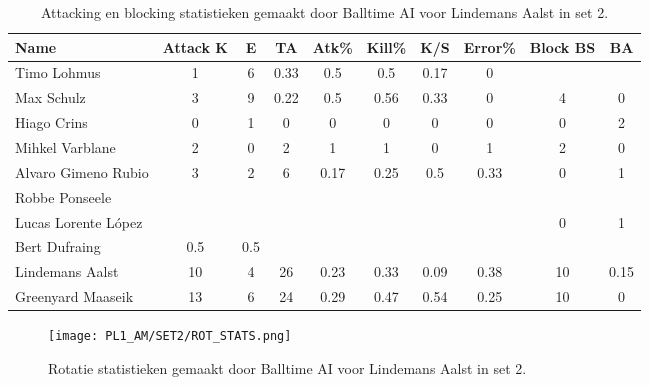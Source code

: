 \begin{table}[ht!]
  \centering
  \scriptsize
  \begin{tabular}{|l|c|c|c|c|c|c|c|c|c|} \hline
    \textbf{Name} & Attack K & E & TA & Atk\% & Kill\% & K/S & Error\% & Block BS & BA \\ \hline
    Timo Lohmus & 1 & 6 & 0.33 & 0.5 & 0.5 & 0.17 & 0 &  &  \\
    Max Schulz & 3 & 9 & 0.22 & 0.5 & 0.56 & 0.33 & 0 & 4 & 0 \\
    Hiago Crins & 0 & 1 & 0 & 0 & 0 & 0 & 0 & 0 & 2 \\
    Mihkel Varblane & 2 & 0 & 2 & 1 & 1 & 0 & 1 & 2 & 0 \\
    Alvaro Gimeno Rubio & 3 & 2 & 6 & 0.17 & 0.25 & 0.5 & 0.33 & 0 & 1 \\
    Robbe Ponseele &  &  &  &  &  &  &  &  &  \\
    Lucas Lorente López &  &  &  &  &  &  &  & 0 & 1 \\
    Bert Dufraing & 0.5 & 0.5 &  &  &  &  &  &  &  \\
    Lindemans Aalst & 10 & 4 & 26 & 0.23 & 0.33 & 0.09 & 0.38 & 10 & 0.15 \\
    Greenyard Maaseik & 13 & 6 & 24 & 0.29 & 0.47 & 0.54 & 0.25 & 10 & 0 \\ \hline
  \end{tabular}
  \caption[Attacking en blocking statistieken gemaakt door Balltime AI voor Lindemans Aalst in set 2]{\label{tab:PL1AttBlockAalst2}Attacking en blocking statistieken gemaakt door Balltime AI voor Lindemans Aalst in set 2.}
\end{table}

\begin{figure}
  \centering
  \texttt{[image: PL1\_AM/SET2/ROT\_STATS.png]}
  \caption{\label{fig:PL1_ROT_STATS_2}Rotatie statistieken gemaakt door Balltime AI voor Lindemans Aalst in set 2.}
\end{figure}
